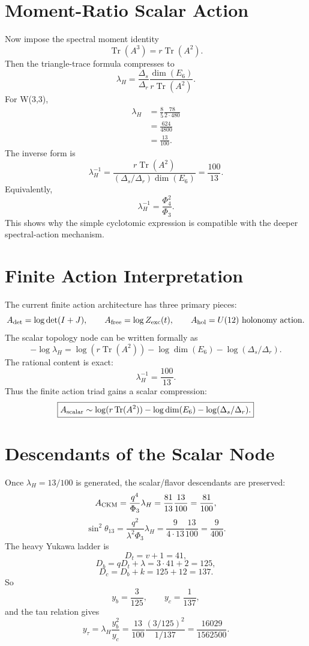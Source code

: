 \documentclass[11pt]{article}
\theoremstyle{definition}
\newcommand{\Tr}{\operatorname{Tr}}
\newcommand{\lamH}{\lambda_H}
\newcommand{\Deltar}{\Delta_r}
\newcommand{\Deltas}{\Delta_s}
\newcommand{\PhiThree}{\Phi_3}
\newcommand{\PhiFour}{\Phi_4}
\begin{document}
\section{Moment-Ratio Scalar Action}

Now impose the spectral moment identity
\[
  \Tr(A^3)=r\Tr(A^2).
\]
Then the triangle-trace formula compresses to
\[
  \boxed{\displaystyle
  \lamH = \frac{\Deltas}{\Deltar}\frac{\dim(E_6)}{r\Tr(A^2)}.}
\]
For W(3,3),
\[
\begin{aligned}
  \lamH
  &= \frac85\frac{78}{2\cdot480} \\
  &= \frac{624}{4800} \\
  &= \frac{13}{100}.
\end{aligned}
\]
The inverse form is
\[
  \boxed{\displaystyle
  \lamH^{-1}=\frac{r\Tr(A^2)}{(\Deltas/\Deltar)\dim(E_6)}=\frac{100}{13}.}
\]
Equivalently,
\[
  \lamH^{-1}=\frac{\PhiFour^2}{\PhiThree}.
\]
This shows why the simple cyclotomic expression is compatible with the deeper spectral-action mechanism.

\section{Finite Action Interpretation}

The current finite action architecture has three primary pieces:
\[
  A_{\det}=\log\det(I+J),
  \qquad
  A_{\rm free}=\log Z_{\rm exc}(t),
  \qquad
  A_{\rm hol}=U(12)\text{ holonomy action}.
\]
The scalar topology node can be written formally as
\[
  -\log\lamH
  =\log(r\Tr(A^2))-\log\dim(E_6)-\log(\Deltas/\Deltar).
\]
The rational content is exact:
\[
  \lamH^{-1}=\frac{100}{13}.
\]
Thus the finite action triad gains a scalar compression:
\[
\boxed{
A_{\rm scalar}\sim \log(r\Tr(A^2))-\log\dim(E_6)-\log(\Deltas/\Deltar).
}
\]

\section{Descendants of the Scalar Node}

Once \(\lamH=13/100\) is generated, the scalar/flavor descendants are preserved:
\[
  A_{\rm CKM}=\frac{q^4}{\PhiThree}\lamH
  =\frac{81}{13}\frac{13}{100}
  =\frac{81}{100},
\]
\[
  \sin^2\theta_{13}
  =\frac{q^2}{\lambda^2\PhiThree}\lamH
  =\frac{9}{4\cdot13}\frac{13}{100}
  =\frac{9}{400}.
\]
The heavy Yukawa ladder is
\[
  D_t=v+1=41,
\]
\[
  D_b=qD_t+\lambda=3\cdot41+2=125,
\]
\[
  D_c=D_b+k=125+12=137.
\]
So
\[
  y_b=\frac{3}{125},
  \qquad
  y_c=\frac1{137},
\]
and the tau relation gives
\[
  y_\tau=\lamH\frac{y_b^2}{y_c}
  =\frac{13}{100}\frac{(3/125)^2}{1/137}
  =\frac{16029}{1562500}.
\]
\end{document}
